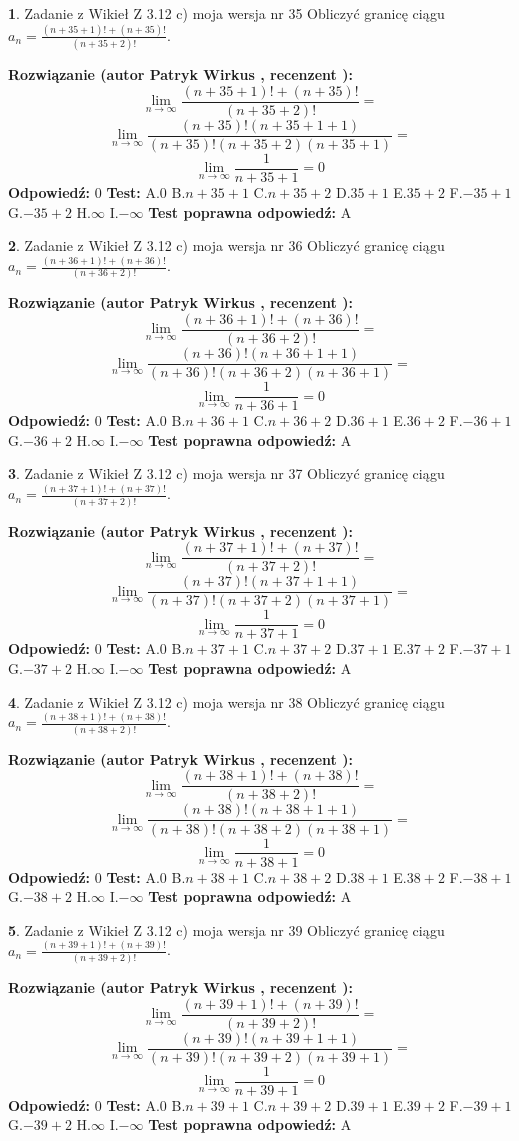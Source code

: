 \documentclass[12pt, a4paper]{article}
\theoremstyle{definition} %
\newtheorem{zad}{}
\newcommand{\zadStart}[1]{\begin{zad}#1\newline}
\newcommand{\zadStop}{\end{zad}}
\newcommand{\rozwStart}[2]{\noindent \textbf{Rozwiązanie (autor #1 , recenzent #2): }\newline}
\newcommand{\rozwStop}{\newline}
\newcommand{\odpStart}{\noindent \textbf{Odpowiedź:}\newline}
\newcommand{\odpStop}{\newline}
\newcommand{\testStart}{\noindent \textbf{Test:}\newline}
\newcommand{\testStop}{\newline}
\newcommand{\kluczStart}{\noindent \textbf{Test poprawna odpowiedź:}\newline}
\newcommand{\kluczStop}{\newline}
\begin{document}
\zadStart{Zadanie z Wikieł Z 3.12 c) moja wersja nr 35}
Obliczyć granicę ciągu $a_{n}=\frac{(n+35+1)!+(n+35)!}{(n+35+2)!}$.
\zadStop
\rozwStart{Patryk Wirkus}{}
$$\lim\limits_{n\to\infty}\frac{(n+35+1)!+(n+35)!}{(n+35+2)!}=$$
$$\lim\limits_{n\to\infty}\frac{(n+35)!(n+35+1+1)}{(n+35)!(n+35+2)(n+35+1)}=$$
$$\lim\limits_{n\to\infty}\frac{1}{n+35+1}= 0$$
\rozwStop
\odpStart
$0$
\odpStop
\testStart
A.$0$
B.$n+35+1$
C.$n+35+2$
D.$35+1$
E.$35+2$
F.$-35+1$
G.$-35+2$
H.$\infty$
I.$-\infty$
\testStop
\kluczStart
A
\kluczStop



\zadStart{Zadanie z Wikieł Z 3.12 c) moja wersja nr 36}
Obliczyć granicę ciągu $a_{n}=\frac{(n+36+1)!+(n+36)!}{(n+36+2)!}$.
\zadStop
\rozwStart{Patryk Wirkus}{}
$$\lim\limits_{n\to\infty}\frac{(n+36+1)!+(n+36)!}{(n+36+2)!}=$$
$$\lim\limits_{n\to\infty}\frac{(n+36)!(n+36+1+1)}{(n+36)!(n+36+2)(n+36+1)}=$$
$$\lim\limits_{n\to\infty}\frac{1}{n+36+1}= 0$$
\rozwStop
\odpStart
$0$
\odpStop
\testStart
A.$0$
B.$n+36+1$
C.$n+36+2$
D.$36+1$
E.$36+2$
F.$-36+1$
G.$-36+2$
H.$\infty$
I.$-\infty$
\testStop
\kluczStart
A
\kluczStop



\zadStart{Zadanie z Wikieł Z 3.12 c) moja wersja nr 37}
Obliczyć granicę ciągu $a_{n}=\frac{(n+37+1)!+(n+37)!}{(n+37+2)!}$.
\zadStop
\rozwStart{Patryk Wirkus}{}
$$\lim\limits_{n\to\infty}\frac{(n+37+1)!+(n+37)!}{(n+37+2)!}=$$
$$\lim\limits_{n\to\infty}\frac{(n+37)!(n+37+1+1)}{(n+37)!(n+37+2)(n+37+1)}=$$
$$\lim\limits_{n\to\infty}\frac{1}{n+37+1}= 0$$
\rozwStop
\odpStart
$0$
\odpStop
\testStart
A.$0$
B.$n+37+1$
C.$n+37+2$
D.$37+1$
E.$37+2$
F.$-37+1$
G.$-37+2$
H.$\infty$
I.$-\infty$
\testStop
\kluczStart
A
\kluczStop



\zadStart{Zadanie z Wikieł Z 3.12 c) moja wersja nr 38}
Obliczyć granicę ciągu $a_{n}=\frac{(n+38+1)!+(n+38)!}{(n+38+2)!}$.
\zadStop
\rozwStart{Patryk Wirkus}{}
$$\lim\limits_{n\to\infty}\frac{(n+38+1)!+(n+38)!}{(n+38+2)!}=$$
$$\lim\limits_{n\to\infty}\frac{(n+38)!(n+38+1+1)}{(n+38)!(n+38+2)(n+38+1)}=$$
$$\lim\limits_{n\to\infty}\frac{1}{n+38+1}= 0$$
\rozwStop
\odpStart
$0$
\odpStop
\testStart
A.$0$
B.$n+38+1$
C.$n+38+2$
D.$38+1$
E.$38+2$
F.$-38+1$
G.$-38+2$
H.$\infty$
I.$-\infty$
\testStop
\kluczStart
A
\kluczStop



\zadStart{Zadanie z Wikieł Z 3.12 c) moja wersja nr 39}
Obliczyć granicę ciągu $a_{n}=\frac{(n+39+1)!+(n+39)!}{(n+39+2)!}$.
\zadStop
\rozwStart{Patryk Wirkus}{}
$$\lim\limits_{n\to\infty}\frac{(n+39+1)!+(n+39)!}{(n+39+2)!}=$$
$$\lim\limits_{n\to\infty}\frac{(n+39)!(n+39+1+1)}{(n+39)!(n+39+2)(n+39+1)}=$$
$$\lim\limits_{n\to\infty}\frac{1}{n+39+1}= 0$$
\rozwStop
\odpStart
$0$
\odpStop
\testStart
A.$0$
B.$n+39+1$
C.$n+39+2$
D.$39+1$
E.$39+2$
F.$-39+1$
G.$-39+2$
H.$\infty$
I.$-\infty$
\testStop
\kluczStart
A
\kluczStop
\end{document}
